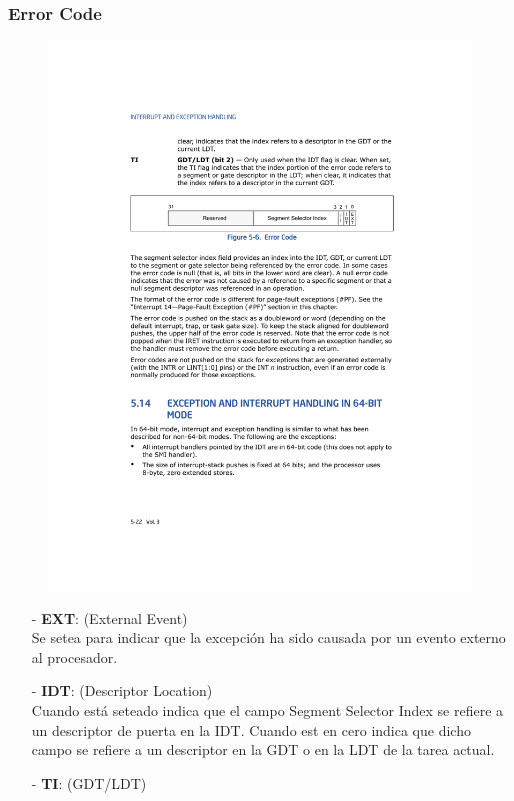 \documentclass[aspectratio=169]{beamer}
\begin{document}
\begin{frame}
    \frametitle{Error Code}
    \begin{figure}
    \centering
    \includegraphics[scale=0.8]{img/error_code}
    \end{figure}
    \vspace{-0.3cm}
    \begin{itemize}
    \setlength\itemsep{0.1cm}
    \pause
    \item[-] \textbf{EXT}: (External Event)\\
    Se setea para indicar que la excepción ha sido causada por un evento externo al procesador.
    \pause
    \item[-] \textbf{IDT}: (Descriptor Location)\\
    Cuando está seteado indica que el campo Segment Selector Index se refiere a un descriptor de puerta en la IDT. Cuando est en cero indica que dicho campo se refiere a un descriptor en la GDT o en la LDT de la tarea actual.
    \pause
    \item[-] \textbf{TI}: (GDT/LDT)\\

\end{itemize}
\end{frame}
\end{document}
